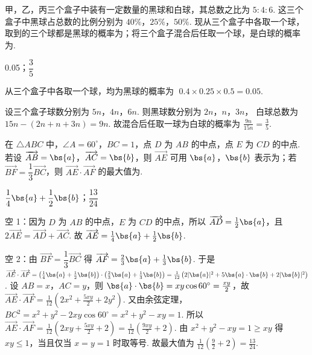 \begin{problem}
甲，乙，丙三个盒子中装有一定数量的黑球和白球，其总数之比为 \(5:4:6\). 这三个盒子中黑球占总数的比例分别为 \(40\%\)，\(25\%\)，\(50\%\). 现从三个盒子中各取一个球，取到的三个球都是黑球的概率为\fillinblank{}；将三个盒子混合后任取一个球，是白球的概率为\fillinblank{}.
\end{problem}

\begin{answer}
0.05；\(\dfrac{3}{5}\)
\end{answer}

\begin{solution}
从三个盒子中各取一个球，均为黑球的概率为 \(\;0.4\times 0.25\times 0.5=0.05\).

设三个盒子球数分别为 \(5n\)，\(4n\)，\(6n\). 则黑球数分别为
\(2n\)，\(n\)，\(3n\)，
白球总数为
\(15n-(2n+n+3n)=9n\).
故混合后任取一球为白球的概率为 \(\frac{9n}{15n}=\frac{3}{5}\).
\end{solution}

\begin{problem}
在 \(\triangle ABC\) 中，\(\angle A=60^\circ\)，\(BC=1\)，点 \(D\) 为 \(AB\) 的中点，点 \(E\) 为 \(CD\) 的中点. 若设 \(\overrightarrow{AB}=\bs{a}\)，\(\overrightarrow{AC}=\bs{b}\)，则 \(\overrightarrow{AE}\) 可用 \(\bs{a}\)，\(\bs{b}\) 表示为\fillinblank{}；若 \(\overrightarrow{BF}=\dfrac{1}{3}\overrightarrow{BC}\)，则 \(\overrightarrow{AE}\cdot \overrightarrow{AF}\) 的最大值为\fillinblank{}.
\end{problem}

\begin{answer}
\(\dfrac{1}{4}\bs{a}+\dfrac{1}{2}\bs{b}\)；\(\dfrac{13}{24}\)
\end{answer}

\begin{solution}
空 1：因为 \(D\) 为 \(AB\) 的中点，\(E\) 为 \(CD\) 的中点，所以 \(\overrightarrow{AD}=\frac{1}{2}\bs{a}\)，且
\(2\overrightarrow{AE}=\overrightarrow{AD}+\overrightarrow{AC}\).
故 \(\overrightarrow{AE}=\frac{1}{4}\bs{a}+\frac{1}{2}\bs{b}\).

空 2：由 \(\overrightarrow{BF}=\dfrac{1}{3}\overrightarrow{BC}\) 得 \(\overrightarrow{AF}=\frac{2}{3}\bs{a}+\frac{1}{3}\bs{b}\). 于是 \(\overrightarrow{AE}\cdot \overrightarrow{AF}=\left( \frac{1}{4}\bs{a}+\frac{1}{2}\bs{b} \right)\cdot \left( \frac{2}{3}\bs{a}+\frac{1}{3}\bs{b} \right)=\frac{1}{12}\left( 2|\bs{a}|^2+5\bs{a}\cdot\bs{b}+2|\bs{b}|^2 \right)\).
设 \(AB=x\)，\(AC=y\)，则 \(\bs{a}\cdot\bs{b}=xy\cos 60^\circ=\frac{xy}{2}\)，故
\(\overrightarrow{AE}\cdot \overrightarrow{AF}=\frac{1}{12}\left( 2x^2+\frac{5xy}{2}+2y^2 \right)\).
又由余弦定理，
\(BC^2=x^2+y^2-2xy\cos 60^\circ=x^2+y^2-xy=1\).
所以 \(\overrightarrow{AE}\cdot \overrightarrow{AF}=\frac{1}{12}\left( 2xy+\frac{5xy}{2}+2 \right)=\frac{1}{12}\left( \frac{9xy}{2}+2 \right)\).
由 \(x^2+y^2-xy=1\ge xy\) 得 \(xy\le 1\)，当且仅当 \(x=y=1\) 时取等号. 故最大值为
\(\frac{1}{12}\left( \frac{9}{2}+2 \right)=\frac{13}{24}\).
\end{solution}

